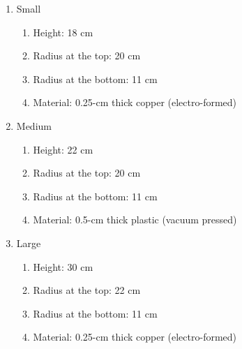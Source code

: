 \begin{enumerate}

\item Small
	\begin{enumerate}
		\item Height: 18 cm
		\item Radius at the top: 20 cm
		\item Radius at the bottom: 11 cm
		\item Material: 0.25-cm thick copper (electro-formed)
	\end{enumerate}

	\item Medium
	\begin{enumerate}
		\item Height: 22 cm
		\item Radius at the top: 20 cm
		\item Radius at the bottom: 11 cm
		\item Material: 0.5-cm thick plastic (vacuum pressed)
	\end{enumerate}

	\item Large
	\begin{enumerate}
		\item Height: 30 cm
		\item Radius at the top: 22 cm
		\item Radius at the bottom: 11 cm
		\item Material: 0.25-cm thick copper (electro-formed)
	\end{enumerate}
\end{enumerate}

